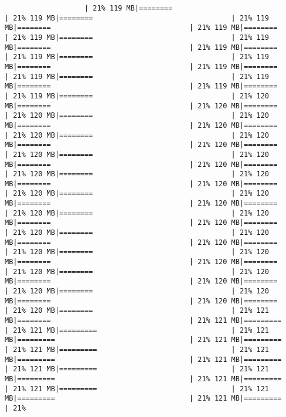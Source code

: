 \documentclass[
]{article}
\begin{document}
\begin{verbatim}
                   | 21% 119 MB|========                                 | 21% 119 MB|========                                 | 21% 119 MB|========                                 | 21% 119 MB|========                                 | 21% 119 MB|========                                 | 21% 119 MB|========                                 | 21% 119 MB|========                                 | 21% 119 MB|========                                 | 21% 119 MB|========                                 | 21% 119 MB|========                                 | 21% 119 MB|========                                 | 21% 119 MB|========                                 | 21% 119 MB|========                                 | 21% 119 MB|========                                 | 21% 120 MB|========                                 | 21% 120 MB|========                                 | 21% 120 MB|========                                 | 21% 120 MB|========                                 | 21% 120 MB|========                                 | 21% 120 MB|========                                 | 21% 120 MB|========                                 | 21% 120 MB|========                                 | 21% 120 MB|========                                 | 21% 120 MB|========                                 | 21% 120 MB|========                                 | 21% 120 MB|========                                 | 21% 120 MB|========                                 | 21% 120 MB|========                                 | 21% 120 MB|========                                 | 21% 120 MB|========                                 | 21% 120 MB|========                                 | 21% 120 MB|========                                 | 21% 120 MB|========                                 | 21% 120 MB|========                                 | 21% 120 MB|========                                 | 21% 120 MB|========                                 | 21% 120 MB|========                                 | 21% 120 MB|========                                 | 21% 120 MB|========                                 | 21% 120 MB|========                                 | 21% 120 MB|========                                 | 21% 120 MB|========                                 | 21% 120 MB|========                                 | 21% 120 MB|========                                 | 21% 120 MB|========                                 | 21% 120 MB|========                                 | 21% 120 MB|========                                 | 21% 121 MB|========                                 | 21% 121 MB|=========                                | 21% 121 MB|=========                                | 21% 121 MB|=========                                | 21% 121 MB|=========                                | 21% 121 MB|=========                                | 21% 121 MB|=========                                | 21% 121 MB|=========                                | 21% 121 MB|=========                                | 21% 121 MB|=========                                | 21% 121 MB|=========                                | 21% 121 MB|=========                                | 21% 121 MB|=========                                | 21% 121 MB|=========                                | 21% 
\end{verbatim}
\end{document}
